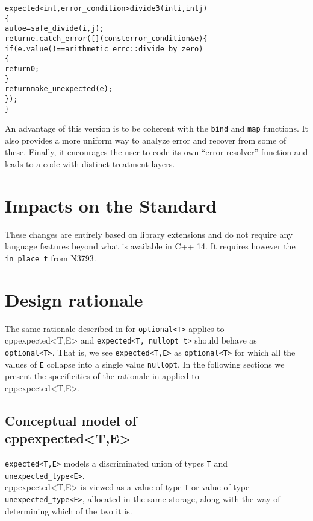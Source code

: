 \documentclass[a4paper,10pt]{article}
\newcommand{\cpp}[1]{\lstinline{#1}}
\begin{document}
\begin{alltt}
expected<int, error_condition> divide3(int i, int j)
\{
  auto e = safe_divide(i,j);
  return e.catch_error([](const error_condition& e)\{
    if(e.value() == arithmetic_errc::divide_by_zero)
    \{
      return 0;
    \}
    return make_unexpected(e);
  \});
\}
\end{alltt}

An advantage of this version is to be coherent with the \cpp{bind} and \cpp{map} functions. It also provides a more uniform way to analyze error and recover from some of these. Finally, it encourages the user to code its own ``error-resolver'' function and leads to a code with distinct treatment layers.

\section{Impacts on the Standard}

These changes are entirely based on library extensions and do not require any language features beyond what is available in C++ 14. It requires however the \cpp{in_place_t} from N3793.

\section{Design rationale}

The same rationale described in \cite{OptionalRev4} for \cpp{optional<T>} applies to \\cpp{expected<T,E>} and \cpp{expected<T, nullopt_t>} should behave as \cpp{optional<T>}.  That is, we see \cpp{expected<T,E>} as \cpp{optional<T>} for which all the values of \cpp{E} collapse into a single value \cpp{nullopt}. In the following sections we present the specificities of the rationale in \cite{OptionalRev4} applied to  \\cpp{expected<T,E>}.

\subsection{Conceptual model of \\cpp{expected<T,E>}}

\cpp{expected<T,E>} models a discriminated union of types \cpp{T} and \cpp{unexpected_type<E>}. \\cpp{expected<T,E>} is viewed as a value of type \cpp{T} or value of type \cpp{unexpected_type<E>}, allocated in the same storage, along with the way of determining which of the two it is. 
\end{document}
